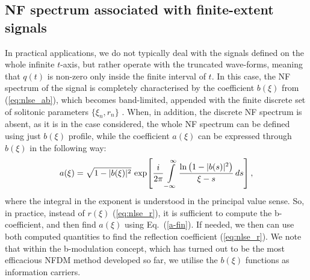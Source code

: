 \subsection{NF spectrum associated with finite-extent signals}
In practical applications, we do not typically deal with the signals defined on the whole infinite $t$-axis, but rather operate with the truncated wave-forms, meaning that $q(t)$ is non-zero only inside the finite interval of $t$. In this case, the NF spectrum of the signal is completely characterised by the coefficient $b(\xi)$ from (\ref{eq:nlse_ab}), which becomes band-limited, appended with the finite discrete set of solitonic parameters $\{\xi_n,r_n\}$ \cite{gzl18,svp20}. When, in addition, the discrete NF spectrum is absent, as it is in the case considered, the whole NF spectrum can be defined using just $b(\xi)$ profile\cite{w17}, while the coefficient $a(\xi)$ can be expressed through $b(\xi)$ in the following way:
\begin{equation}\label{a-fin}
a(\xi) = \sqrt{1-|b(\xi)|^2} \, \exp \! \left[ \frac{i}{2 \pi} \intop^{\infty}_{-\infty} \frac{\ln \big(1-|b(s)|^2 \big)}{\xi - s} \, ds \right],
\end{equation}
where the integral in the exponent is understood in the principal value sense.
So, in practice, instead of $r(\xi)$ (\ref{eq:nlse_r}), it is sufficient to compute the b-coefficient, and then find $a(\xi)$ using Eq.~(\ref{a-fin}). If needed, we then can use both computed quantities to find the reflection coefficient (\ref{eq:nlse_r}). We note that within the b-modulation concept, which has turned out to be the most efficacious NFDM method developed so far, we utilise the $b(\xi)$ functions as information carriers\cite{w17,gzl18,svp20,cw20}.




